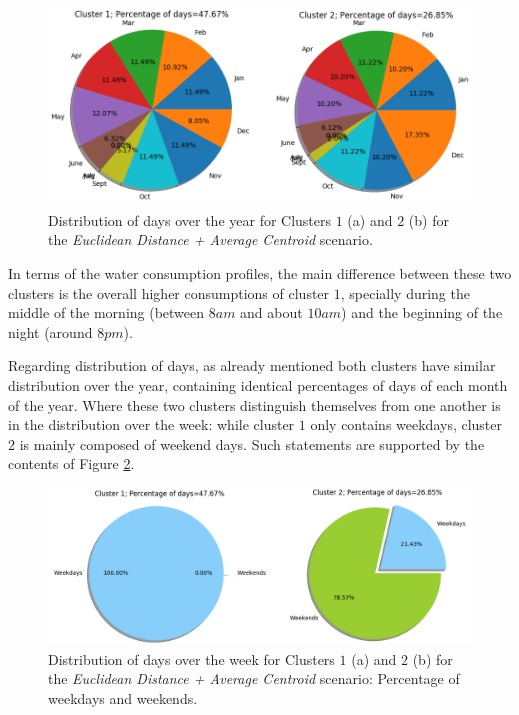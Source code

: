 \documentclass[9pt,journal,compsoc]{IEEEtran}
\begin{document}
\begin{figure}
	\centering
	\includegraphics[scale=0.4]{images/percent_months_euc_average_k12_4.png}
	\caption{Distribution of days over the year for Clusters $1$ (a) and $2$ (b) for the \emph{Euclidean Distance + Average Centroid} scenario.}
	\label{year_dist_k12_euc_average4}
\end{figure}

In terms of the water consumption profiles, the main difference between these two clusters is the overall higher consumptions of cluster $1$, specially during the middle of the morning (between $8am$ and about $10am$) and the beginning of the night (around $8pm$).

Regarding distribution of days, as already mentioned both clusters have similar distribution over the year, containing identical percentages of days of each month of the year. Where these two clusters distinguish themselves from one another is in the distribution over the week: while cluster $1$ only contains weekdays, cluster $2$ is mainly composed of weekend days. Such statements are supported by the contents of Figure \ref{week_dist_k12_eu_average4}.

\begin{figure}
	\centering
	\includegraphics[scale=0.4]{images/percent_week_euc_average_k12_4.png}
	\caption{Distribution of days over the week for Clusters $1$ (a) and $2$ (b) for the \emph{Euclidean Distance + Average Centroid} scenario: Percentage of weekdays and weekends.}
	\label{week_dist_k12_eu_average4}
\end{figure}
\end{document}
